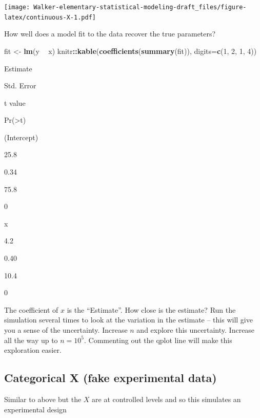 \documentclass[]{book}
\newenvironment{Shaded}{\begin{snugshade}}{\end{snugshade}}
\newcommand{\KeywordTok}[1]{\textcolor[rgb]{0.13,0.29,0.53}{\textbf{#1}}}
\newcommand{\DataTypeTok}[1]{\textcolor[rgb]{0.13,0.29,0.53}{#1}}
\newcommand{\DecValTok}[1]{\textcolor[rgb]{0.00,0.00,0.81}{#1}}
\newcommand{\StringTok}[1]{\textcolor[rgb]{0.31,0.60,0.02}{#1}}
\newcommand{\OperatorTok}[1]{\textcolor[rgb]{0.81,0.36,0.00}{\textbf{#1}}}
\newcommand{\NormalTok}[1]{#1}
\begin{document}
\texttt{[image: Walker-elementary-statistical-modeling-draft\_files/figure-latex/continuous-X-1.pdf]}

How well does a model fit to the data recover the true parameters?

\begin{Shaded}
\begin{Highlighting}[]
\NormalTok{fit <-}\StringTok{ }\KeywordTok{lm}\NormalTok{(y }\OperatorTok{~}\StringTok{ }\NormalTok{x)}
\NormalTok{knitr}\OperatorTok{::}\KeywordTok{kable}\NormalTok{(}\KeywordTok{coefficients}\NormalTok{(}\KeywordTok{summary}\NormalTok{(fit)), }\DataTypeTok{digits=}\KeywordTok{c}\NormalTok{(}\DecValTok{1}\NormalTok{, }\DecValTok{2}\NormalTok{, }\DecValTok{1}\NormalTok{, }\DecValTok{4}\NormalTok{))}
\end{Highlighting}
\end{Shaded}

Estimate

Std. Error

t value

Pr(\textgreater{}\textbar{}t\textbar{})

(Intercept)

25.8

0.34

75.8

0

x

4.2

0.40

10.4

0

The coefficient of \(x\) is the ``Estimate''. How close is the estimate?
Run the simulation several times to look at the variation in the
estimate -- this will give you a sense of the uncertainty. Increase
\(n\) and explore this uncertainty. Increase all the way up to
\(n=10^5\). Commenting out the qplot line will make this exploration
easier.

\subsection{Categorical X (fake experimental
data)}\label{categorical-x-fake-experimental-data}

Similar to above but the \(X\) are at controlled levels and so this
simulates an experimental design
\end{document}
